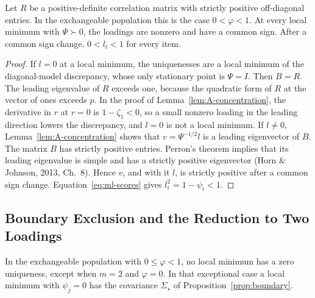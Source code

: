 \begin{applemma}
\label{lem:A-interior}
Let $R$ be a positive-definite correlation matrix with strictly positive off-diagonal entries. In the exchangeable population this is the case $0<\varphi<1$. At every local minimum with $\Psi\succ0$, the loadings are nonzero and have a common sign. After a common sign change, $0<l_i<1$ for every item.
\end{applemma}

\begin{proof}
If $l=0$ at a local minimum, the uniquenesses are a local minimum of the diagonal-model discrepancy, whose only stationary point is $\Psi=I$. Then $B=R$. The leading eigenvalue of $R$ exceeds one, because the quadratic form of $R$ at the vector of ones exceeds $p$. In the proof of Lemma~\ref{lem:A-concentration}, the derivative in $r$ at $r=0$ is $1-\zeta_1<0$, so a small nonzero loading in the leading direction lowers the discrepancy, and $l=0$ is not a local minimum. If $l\ne0$, Lemma~\ref{lem:A-concentration} shows that $v=\Psi^{-1/2}l$ is a leading eigenvector of $B$. The matrix $B$ has strictly positive entries. Perron's theorem implies that its leading eigenvalue is simple and has a strictly positive eigenvector (Horn \& Johnson, 2013, Ch.~8). Hence $v$, and with it $l$, is strictly positive after a common sign change. Equation~\eqref{eq:ml-scores} gives $l_i^2=1-\psi_i<1$.
\end{proof}

\subsection{Boundary Exclusion and the Reduction to Two Loadings}

\begin{applemma}
\label{lem:A-boundary}
In the exchangeable population with $0\le\varphi<1$, no local minimum has a zero uniqueness, except when $m=2$ and $\varphi=0$. In that exceptional case a local minimum with $\psi_j=0$ has the covariance $\Sigma_\star$ of Proposition~\ref{prop:boundary}.
\end{applemma}

